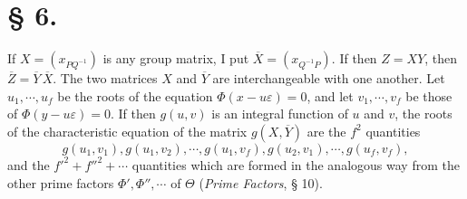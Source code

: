 \documentclass[11pt]{article}
\newcommand{\eps}{\varepsilon}
\begin{document}
\section*{§ 6.}

If $X=(x_{PQ^{-1}})$ is any group matrix, I put $\overline{X}=(x_{Q^{-1}P})$. If then $Z=XY$, then $\overline{Z}=\overline{Y}\,\overline{X}$. The two matrices $X$ and $\overline{Y}$ are interchangeable with one another. Let $u_1,\cdots,u_f$ be the roots of the equation $\Phi(x-u\eps)=0$, and let $v_1,\cdots,v_f$ be those of $\Phi(y-u\eps)=0$. If then $g(u,v)$ is an integral function of $u$ and $v$, the roots of the characteristic equation of the matrix $g(X,\overline{Y})$ are the $f^2$ quantities
\[
g(u_1,v_1),g(u_1,v_2),\cdots,g(u_1,v_f),g(u_2,v_1),\cdots,g(u_f,v_f),
\]
and the $f'^2+f''^2+\cdots$ quantities which are formed in the analogous way from the other prime factors $\Phi',\Phi'',\cdots$ of $\Theta$ (\emph{Prime Factors}, § 10).
\end{document}

